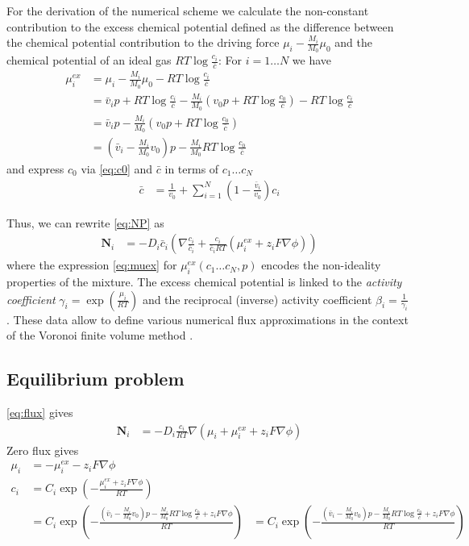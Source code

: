 \documentclass[12pt,oneside,reqno]{amsart}
\numberwithin{equation}{section}
\begin{document}
For the derivation of the numerical scheme we calculate the non-constant
contribution to the excess chemical potential defined as the difference between the chemical potential
contribution to the driving force $\mu_i - \frac{M_i}{M_0}\mu_0$ and the chemical potential of an ideal gas
$RT \log \frac{c_i}{\bar c}$:
For $i=1\dots N$ we have
\begin{align}
  \mu_i^{ex} &=  \mu_i - \frac{M_i}{M_0} \mu_0  - RT \log \frac{c_i}{\bar c} \nonumber\\
             &= \bar v_ip +  RT \log \frac{c_i}{\bar c}  -\frac{M_i}{M_0}\left(  v_0p + RT \log \frac{c_0}{\bar c}\right)  - RT \log \frac{c_i}{\bar c} \nonumber\\
            &= \bar v_ip  -\frac{M_i}{M_0}\left(  v_0p + RT \log \frac{c_0}{\bar c}\right)\nonumber\\
            &= \left(\bar v_i-\frac{M_i}{M_0}v_0\right)p - \frac{M_i}{M_0}RT\log \frac{c_0}{\bar c} \label{eq:muex}
\end{align}
and express $c_0$ via \eqref{eq:c0} and $\bar c$ in terms of $c_1\dots c_N$
\begin{align*}
  \bar c &%
          = \frac{1}{v_0} + \sum_{i=1}^N \left(1- \frac{\bar v_i}{v_0}\right) c_i 
\end{align*}

Thus, we can rewrite \eqref{eq:NP}  as 
\begin{align}\label{eq:flux}
  \mathbf N_i &= - D_i\bar c_i \left(\nabla \frac{c_i}{\bar c_i} + \frac{c_i}{\bar c_iRT} (\mu_i^{ex} + z_i F \nabla \phi) \right)
\end{align}
where the expression \eqref{eq:muex} for $\mu_i^{ex}(c_1\dots c_N, p)$  encodes the non-ideality properties of the mixture.
The excess chemical potential is linked to the \textit{activity coefficient} $\gamma_i=\exp(\frac{\mu_i}{RT})$ and the
reciprocal (inverse) activity coefficient $\beta_i=\frac1{\gamma_i}$  \cite{Fuhrmann2015}.
These data allow to define various numerical flux approximations in the context of the Voronoi finite volume
method \cite{Fuhrmann2015,GaudeulFuhrmannNM2022}.

\subsection{Equilibrium problem}
\eqref{eq:flux} gives
\begin{align}\label{eq:flux}
  \mathbf N_i &= - D_i\frac{c_i}{RT}\nabla\left( \mu_i +  \mu_i^{ex} + z_i F \nabla \phi \right)
\end{align}
Zero flux gives 
\begin{align}
  \mu_i   &=   - \mu_i^{ex} - z_i F \nabla \phi\\
  c_i   &=  C_i\exp\left( -\frac{\mu_i^{ex} + z_i F \nabla \phi}{RT}\right)\\
        &=  C_i \exp\left(-\frac{\left(\bar v_i-\frac{M_i}{M_0}v_0\right)p - \frac{M_i}{M_0}RT\log \frac{c_0}{\bar c} + z_i F \nabla \phi}{RT}\right)
        &=  C_i \exp\left(-\frac{\left(\bar v_i-\frac{M_i}{M_0}v_0\right)p - \frac{M_i}{M_0}RT\log \frac{c_0}{\bar c} + z_i F \nabla \phi}{RT}\right)
\end{align}
\end{document}
